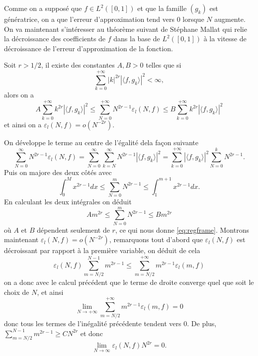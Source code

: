 Comme on a supposé que $f\in L^2([0, 1])$ et que la famille $(g_k)$ est génératrice, on a que l'erreur d'approximation tend vers $0$ lorsque $N$ augmente.
On va maintenant s'intéresser au théorème suivant de Stéphane Mallat qui relie la décroissance des coefficients de $f$ dans la base de $L^2([0, 1])$ à la vitesse de décroissance de l'erreur d'approximation de la fonction.
\begin{theoreme}
	Soit $r > 1/2$, il existe des constantes $A, B > 0$ telles que si 
	\begin{equation}
		\sum_{k=0}^{+\infty} |k|^{2r}|\langle f, g_k \rangle |^2 < \infty,
	\end{equation}
	alors on a 
	\begin{equation}\label{eq:regframe}
		A \sum_{k=0}^{+\infty} k^{2r}|\langle f, g_k \rangle |^2 \leq 
		\sum_{N=0}^{+\infty} N^{2r-1} \varepsilon_l(N, f) \leq
		B \sum_{k=0}^{+\infty} k^{2r} |\langle f, g_k\rangle |^2
	\end{equation}
	et ainsi on a $\varepsilon_l(N, f) = o(N^{-2r})$.
\end{theoreme}
\begin{preuve}
	On développe le terme au centre de l'égalité dela façon suivante 
	\begin{equation*}
		\sum_{N=0}^{\infty} N^{2r-1} \varepsilon_l(N, f) =
		\sum_{N=0}^{\infty} \sum_{k=N}^{\infty} N^{2r-1} |\langle f, g_k \rangle |^2 =
		\sum_{k=0}^{+\infty} |\langle f, g_k \rangle |^2 \sum_{N=0}^{k} N^{2r-1}.
	\end{equation*}
	Puis on majore des deux côtés avec 
	\begin{equation}
		\int_{0}^M x^{2r-1} dx \leq \sum_{N=0}^m N^{2r-1} \leq \int_{1}^{m+1} x^{2r-1}dx.
	\end{equation}
	En calculant les deux intégrales on déduit 
	\begin{equation}
		A m^{2r} \leq \sum_{N=0}^{m} N^{2r-1} \leq B m^{2r}
	\end{equation}
	où $A$ et $B$ dépendent seulement de $r$, ce qui nous donne \ref{eq:regframe}.
	Montrons maintenant $\varepsilon_l(N, f) = o(N^{-2r})$, remarquons tout d'abord que $\varepsilon_l(N, f)$ est décroissant par rapport à la première variable, on déduit de cela
	\begin{equation*}
		\varepsilon_l(N, f)\sum_{m=N/2}^{N-1} m^{2r-1} \leq \sum_{m=N/2}^{+\infty} m^{2r-1} \varepsilon_l(m, f)
	\end{equation*}
	on a donc avec le calcul précédent que le terme de droite converge quel que soit le choix de $N$, et ainsi
	\begin{equation*}
		\lim_{N \to +\infty} \sum_{m=N/2}^{+\infty} m^{2r-1}\varepsilon_l(m, f) = 0
	\end{equation*}
	donc tous les termes de l'inégalité précédente tendent vers 0. 
	De plus, $\sum_{m = N/2}^{N-1} m^{2r-1} \geq CN^{2r}$ et donc
	\begin{equation*}
		\lim_{N\to \infty} \varepsilon_l(N, f)N^{2r} = 0.
	\end{equation*}
\end{preuve}
